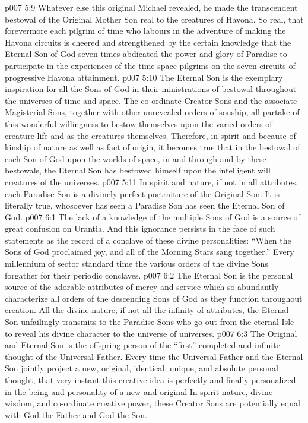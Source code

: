 \vs p007 5:9 Whatever else this original Michael revealed, he made the transcendent bestowal of the Original Mother Son real to the creatures of Havona. So real, that forevermore each pilgrim of time who labours in the adventure of making the Havona circuits is cheered and strengthened by the certain knowledge that the Eternal Son of God seven times abdicated the power and glory of Paradise to participate in the experiences of the time\hyp{}space pilgrims on the seven circuits of progressive Havona attainment.
\vs p007 5:10 \pc The Eternal Son is the exemplary inspiration for all the Sons of God in their ministrations of bestowal throughout the universes of time and space. The co\hyp{}ordinate Creator Sons and the associate Magisterial Sons, together with other unrevealed orders of sonship, all partake of this wonderful willingness to bestow themselves upon the varied orders of creature life and as the creatures themselves. Therefore, in spirit and because of kinship of nature as well as fact of origin, it becomes true that in the bestowal of each Son of God upon the worlds of space, in and through and by these bestowals, the Eternal Son has bestowed himself upon the intelligent will creatures of the universes.
\vs p007 5:11 In spirit and nature, if not in all attributes, each Paradise Son is a divinely perfect portraiture of the Original Son. It is literally true, whosoever has seen a Paradise Son has seen the Eternal Son of God.
\vs p007 6:1 The lack of a knowledge of the multiple Sons of God is a source of great confusion on Urantia. And this ignorance persists in the face of such statements as the record of a conclave of these divine personalities: “When the Sons of God proclaimed joy, and all of the Morning Stars sang together.” Every millennium of sector standard time the various orders of the divine Sons forgather for their periodic conclaves.
\vs p007 6:2 The Eternal Son is the personal source of the adorable attributes of mercy and service which so abundantly characterize all orders of the descending Sons of God as they function throughout creation. All the divine nature, if not all the infinity of attributes, the Eternal Son unfailingly transmits to the Paradise Sons who go out from the eternal Isle to reveal his divine character to the universe of universes.
\vs p007 6:3 \pc The Original and Eternal Son is the offspring\hyp{}person of the “first” completed and infinite thought of the Universal Father. Every time the Universal Father and the Eternal Son jointly project a new, original, identical, unique, and absolute personal thought, that very instant this creative idea is perfectly and finally personalized in the being and personality of a new and original  In spirit nature, divine wisdom, and co\hyp{}ordinate creative power, these Creator Sons are potentially equal with God the Father and God the Son.
